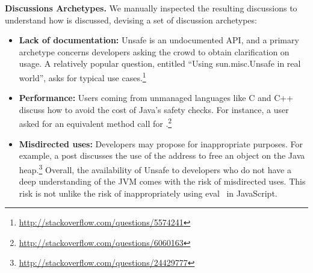 { \bfseries Discussions Archetypes. } 
We manually inspected the resulting discussions to understand how \smu{} is discussed, devising a set of discussion archetypes:

\begin{itemize}
	\item {\bf Lack of documentation:} Unsafe is an undocumented API, and a primary archetype concerns developers asking the crowd to obtain clarification on usage. A relatively popular question, entitled ``Using sun.misc.Unsafe in real world'', asks for typical use cases.\footnote{\url{http://stackoverflow.com/questions/5574241}}

	\item {\bf Performance:} Users coming from unmanaged languages like C and C++ discuss how to avoid the cost of Java's safety checks. For instance, a user asked for an equivalent method call for .\footnote{\url{http://stackoverflow.com/questions/6060163}}


	\item {\bf Misdirected uses:} Developers may propose \unsafe{} for inappropriate purposes. For example, a post discusses the use of the address to free an object on the Java heap.\footnote{\url{http://stackoverflow.com/questions/24429777}}
Overall, the availability of Unsafe to developers who do not have a deep understanding of the JVM comes with the risk of misdirected uses. This risk is not unlike the risk of inappropriately using eval~\cite{Richards:2011:EML:2032497.2032503} in JavaScript.

\end{itemize}
